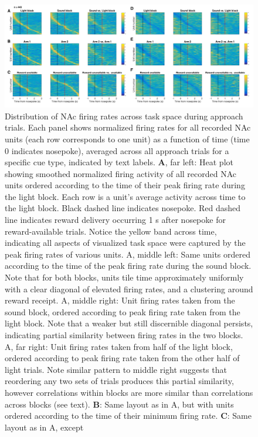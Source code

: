 \documentclass[11pt]{article}
\newcommand{\bsf}[1]{\textbf{#1}}
\begin{document}
{\begin{figure}[h]
\centering
\includegraphics[height=0.5\textheight]{Fig 12 - NP task tiling.png}
\caption{Distribution of NAc firing rates across task space during approach
  trials. Each panel shows normalized firing rates for all recorded NAc units
  (each row corresponds to one unit) as a function of time (time 0 indicates
  nosepoke), averaged across all approach trials for a specific cue type,
  indicated by text labels. \bsf{A}, far left: Heat plot showing smoothed
  normalized firing activity of all recorded NAc units ordered according to the
  time of their peak firing rate during the light block. Each row is a unit’s
  average activity across time to the light block. Black dashed line indicates
  nosepoke. Red dashed line indicates reward delivery occurring 1 s after
  nosepoke for reward-available trials. Notice the yellow band across time,
  indicating all aspects of visualized task space were captured by the peak
  firing rates of various units. A, middle left: Same units ordered according to
  the time of the peak firing rate during the sound block. Note that for both
  blocks, units tile time approximately uniformly with a clear diagonal of
  elevated firing rates, and a clustering around reward receipt. A, middle
  right: Unit firing rates taken from the sound block, ordered according to peak
  firing rate taken from the light block. Note that a weaker but still
  discernible diagonal persists, indicating partial similarity between firing
  rates in the two blocks. A, far right: Unit firing rates taken from half of
  the light block, ordered according to peak firing rate taken from the other
  half of light trials. Note similar pattern to middle right suggests that
  reordering any two sets of trials produces this partial similarity, however
  correlations within blocks are more similar than correlations across blocks
  (see text). \bsf{B}: Same layout as in A, but with units ordered according to
  the time of their minimum firing rate. \bsf{C}: Same layout as in A, except
}
\end{figure}}
\end{document}
